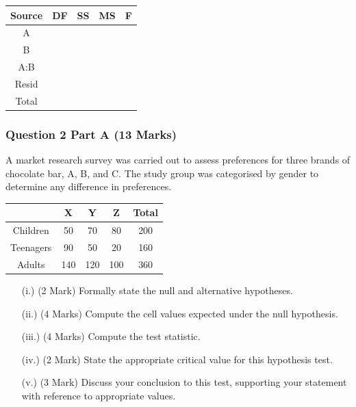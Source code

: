\documentclass[a4paper,12pt]{article}
\begin{document}
		\begin{center}
			\begin{center}
				\begin{tabular}{|c|c|c|c|c|}\hline
					Source & DF & SS & MS & F \\ \hline
					A  & \phantom{makespace}  & \phantom{makespace} & \phantom{makespace} & \phantom{makespace} \\ \hline
					B  &\phantom{makespace} & \phantom{makespace}  & \phantom{makespace}& \phantom{makespace} \\ \hline
					A:B  & \phantom{makespace}& \phantom{makespace} & \phantom{makespace} & \phantom{makespace} \\ \hline
					Resid & \phantom{makespace}& \phantom{makespace} & \phantom{makespace} & \\ \hline \hline
					Total & \phantom{makespace}&\phantom{makespace}  & \phantom{spa} & \\  \hline
				\end{tabular} 
			\end{center}
		\end{center}

\subsubsection*{Question 2 Part A (13 Marks)}

A market research survey was carried out to assess preferences for three brands of chocolate bar, A, B, and C. 
The study group was categorised by gender to determine any difference in preferences.


{
	\large
	\begin{center}
		\begin{tabular}{|c|c|c|c|c|}
			\hline
			& X & Y & Z &  Total\\ \hline
			Children  & 50 & 70 & 80 & 200 \\ \hline
			Teenagers  & 90 & 50 & 20 &  160\\ \hline
			Adults  & 140 & 120 & 100 & 360\\ \hline
		\end{tabular} 
	\end{center}
}
\begin{itemize}
	\item[(i.)](2 Mark) Formally state the null and alternative hypotheses.
	\item[(ii.)] (4 Marks) Compute the cell values expected under the null hypothesis. 
	\item[(iii.)](4 Marks) Compute the test statistic.
	\item[(iv.)](2 Mark) State the appropriate critical value for this hypothesis test.
	\item[(v.)](3 Mark) Discuss your conclusion to this test, supporting your statement with reference to appropriate values.
\end{itemize}
\newpage
\end{document}
